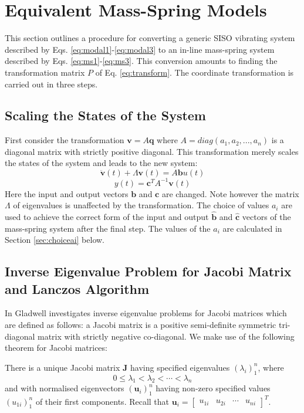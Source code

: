 \documentclass{mbd_fullpaper}
\begin{document}
\section{Equivalent Mass-Spring Models}
\label{sec:algorithms}
This section outlines a procedure for converting a generic SISO vibrating system described by Eqs. \ref{eq:modal1}-\ref{eq:modal3} to an in-line mass-spring system described by Eqs. \ref{eq:ms1}-\ref{eq:ms3}.
This conversion amounts to finding the transformation matrix $P$ of Eq. \ref{eq:transform}.
The coordinate transformation is carried out in three steps.

\subsection{Scaling the States of the System}
First consider the transformation $\mathbf{v} = A \mathbf{q}$ where $A = diag(a_1, a_2, ..., a_n)$ is a diagonal matrix with strictly positive diagonal.
This transformation merely scales the states of the system and leads to the new system:
\begin{equation}
\ddot{\mathbf{v}}(t) +  \Lambda \mathbf{v}(t) =  A \mathbf{b}u(t)
\label{eq:scaled1}
\end{equation}
\begin{equation}
y(t) = \mathbf{c}^T  A^{-1} \mathbf{v}(t)
\label{eq:scaled2}
\end{equation}
Here the input and output vectors $\mathbf{b}$ and $\mathbf{c}$ are changed. Note however the matrix $\Lambda$ of eigenvalues is unaffected by the transformation.
The choice of values $a_i$ are used to achieve the correct form of the input and output $\mathbf{\hat{b}}$ and $\mathbf{\hat{c}}$ vectors of the mass-spring system after the final step.
The values of the $a_i$ are calculated in Section \ref{sec:choiceai} below.

\subsection{Inverse Eigenvalue Problem for Jacobi Matrix and Lanczos Algorithm}
In \cite{gladwell1986inverse} Gladwell investigates inverse eigenvalue problems for Jacobi matrices which are defined as follows:
a Jacobi matrix is a positive semi-definite symmetric tri-diagonal matrix with strictly negative co-diagonal.
We make use of the following theorem for Jacobi matrices:

There is a unique Jacobi matrix $\mathbf{J}$ having specified eigenvalues $(\lambda_i)_1^n$, where
\begin{equation}
0 \leq \lambda_1<\lambda_2< \cdots <\lambda_n
\label{eq:lambda}
\end{equation}
and with normalised eigenvectors $(\mathbf{u}_i)_1^n$  having non-zero specified values $(u_{1i})_1^n$ of their first components.
Recall that $\mathbf{u}_i = \begin{bmatrix} u_{1i} &  u_{2i} & \cdots & u_{ni} \end{bmatrix}^T$.
\end{document}
